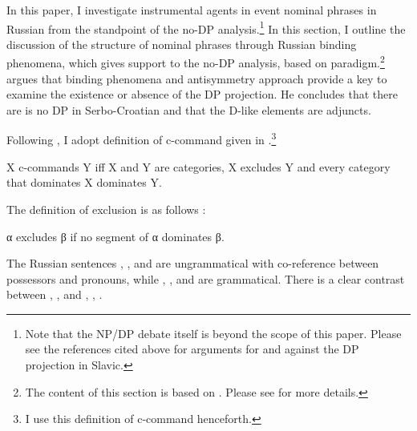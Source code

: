 \documentclass[output=paper,
]{langscibook}
\begin{document}
In this paper, I investigate instrumental agents in event nominal phrases in Russian from the standpoint of the no-DP analysis.\footnote{Note that the NP/DP debate itself is beyond the scope of this paper. Please see the references cited above for arguments for and against the DP projection in Slavic.} 
In this section, I outline the discussion of the structure of nominal phrases through Russian binding phenomena, which gives support to the no-DP analysis, based on  paradigm.\footnote{The content of this section is based on \citet{Miyauchi2016}. Please see \citet{Miyauchi2016} for more details.}  
\citet{Despic2013} argues that binding phenomena and  antisymmetry approach provide a key to examine the existence or absence of the DP projection. He concludes that there are is no DP in Serbo-Croatian and that the D-like elements are adjuncts. 

Following \citet{Despic2013}, I adopt  definition of c-command given in .\footnote{I use this definition of c-command henceforth.}

\begin{exe}
\ex\label{def}
X c-commands Y iff X and Y are categories, X excludes Y and every category that 	dominates X dominates Y.	
\hfill \citep[16]{Kayne1994}
\end{exe}

\noindent
The definition of exclusion is as follows :

\begin{exe}
\ex\label{exc} α excludes β if no segment of α dominates β.
\hfill \citep[9]{Chomsky1986}
\end{exe}

\noindent
The Russian sentences , , and  are ungrammatical with co-reference between possessors and pronouns, while , , and  are grammatical. There is a clear contrast between , ,  and , , .

\begin{exe}\ex\label{bin}
\begin{xlist}
\end{xlist}
\end{exe}
\end{document}
